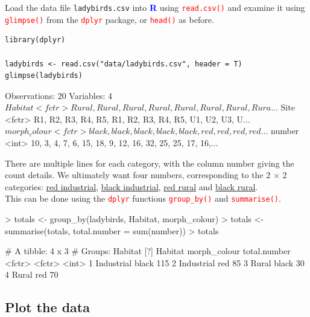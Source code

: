 \documentclass[a4paper,12pt]{article}
\newcommand\boldblue[1]{\textcolor{blue}{\textbf{#1}}}
\newcommand\code[1]{\textcolor{red}{\texttt{#1}}}
\begin{document}
Load the data file \texttt{ladybirds.csv} into \boldblue{R} using \code{read.csv()} and examine it using \code{glimpse()} from the \code{dplyr} package, or \code{head()} as before.

\begin{shaded}
\begin{verbatim}
library(dplyr)

ladybirds <- read.csv("data/ladybirds.csv", header = T)
glimpse(ladybirds)
\end{verbatim}
\begin{Schunk}
\begin{Soutput}
Observations: 20
Variables: 4
$ Habitat      <fctr> Rural, Rural, Rural, Rural, Rural, Rural, Rural, Rura...
$ Site         <fctr> R1, R2, R3, R4, R5, R1, R2, R3, R4, R5, U1, U2, U3, U...
$ morph_colour <fctr> black, black, black, black, black, red, red, red, red...
$ number       <int> 10, 3, 4, 7, 6, 15, 18, 9, 12, 16, 32, 25, 25, 17, 16,...
\end{Soutput}
\end{Schunk}
\end{shaded}

There are multiple lines for each category, with the column number giving the count details. We ultimately want four numbers, corresponding to the 2 $\times$ 2 categories: \underline{red industrial}, \underline{black industrial}, \underline{red rural} and \underline{black rural}. \\

This can be done using the \code{dplyr} functions \code{group\_by()} and \code{summarise()}.

\begin{shaded}
\begin{Schunk}
\begin{Sinput}
> totals <- group_by(ladybirds, Habitat, morph_colour)
> totals <- summarise(totals, total.number = sum(number))
> totals
\end{Sinput}
\begin{Soutput}
# A tibble: 4 x 3
# Groups:   Habitat [?]
     Habitat morph_colour total.number
      <fctr>       <fctr>        <int>
1 Industrial        black          115
2 Industrial          red           85
3      Rural        black           30
4      Rural          red           70
\end{Soutput}
\end{Schunk}
\end{shaded}

\subsection{Plot the data}
\end{document}
